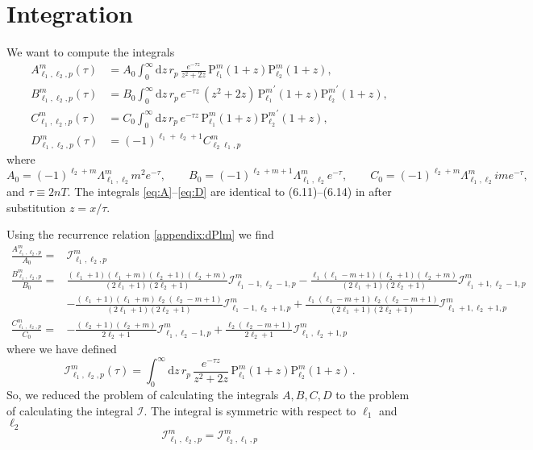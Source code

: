 \documentclass[10pt]{article}
\newcommand{\imag}{i} %
\newcommand{\e}{e}    %
\newcommand{\Plm}[2]{{\text{P}_{#1}^{#2}}}
\begin{document}
\section{Integration}

We want to compute the integrals
\begin{align}
\label{eq:A}
A_{\ell_1,\ell_2,p}^{m}(\tau) &= A_0 \int_0^\infty \mathrm{d}z \, r_p \, \frac{\e^{-\tau z}}{z^2+2z} \, \Plm{\ell_1}{m}(1+z) \Plm{\ell_2}{m}(1+z), \\
\label{eq:B}
B_{\ell_1,\ell_2,p}^{m}(\tau) &= B_0 \int_0^\infty \mathrm{d}z \, r_p \, \e^{-\tau z} \, (z^2+2z) \, \Plm{\ell_1}{m}^\prime(1+z) \Plm{\ell_2}{m}^\prime(1+z), \\
\label{eq:C}
C_{\ell_1,\ell_2,p}^{m}(\tau) &= C_0 \int_0^\infty \mathrm{d}z \, r_p \, \e^{-\tau z} \, \Plm{\ell_1}{m}(1+z) \Plm{\ell_2}{m}^\prime(1+z), \\
\label{eq:D}
D_{\ell_1,\ell_2,p}^{m}(\tau) &= (-1)^{\ell_1+\ell_2+1} C_{\ell_2\ell_1,p}^{m}
\end{align}
where
\begin{equation}
A_0 = (-1)^{\ell_2+m} \Lambda_{\ell_1,\ell_2}^m m^2 \e^{-\tau}, \qquad
B_0 = (-1)^{\ell_2+m+1} \Lambda_{\ell_1,\ell_2}^m \e^{-\tau}, \qquad
C_0 = (-1)^{\ell_2+m} \Lambda_{\ell_1,\ell_2}^m \imag m \e^{-\tau},
\end{equation}
and $\tau \equiv 2nT$.
The integrals \eqref{eq:A}--\eqref{eq:D} are identical to (6.11)--(6.14) in
\cite{hartmann} after substitution $z = x/\tau$.

Using the recurrence relation \eqref{appendix:dPlm} we find
\begin{align}
\frac{A_{\ell_1,\ell_2,p}^{m}}{A_0} =& \mathcal{I}_{\ell_1,\ell_2,p}^{m} \\
\nonumber
\frac{B_{\ell_1,\ell_2,p}^{m}}{B_0} =& \frac{(\ell_1+1)(\ell_1+m)(\ell_2+1)(\ell_2+m)}{(2\ell_1+1)(2\ell_2+1)} \mathcal{I}_{\ell_1-1,\ell_2-1,p}^{m} - \frac{\ell_1(\ell_1-m+1)(\ell_2+1)(\ell_2+m)}{(2\ell_1+1)(2\ell_2+1)} \mathcal{I}_{\ell_1+1,\ell_2-1,p}^{m} \\
& - \frac{(\ell_1+1)(\ell_1+m)\ell_2(\ell_2-m+1)}{(2\ell_1+1)(2\ell_2+1)} \mathcal{I}_{\ell_1-1,\ell_2+1,p}^{m} + \frac{\ell_1(\ell_1-m+1)\ell_2(\ell_2-m+1)}{(2\ell_1+1)(2\ell_2+1)} \mathcal{I}_{\ell_1+1,\ell_2+1,p}^{m} \\
\frac{C_{\ell_1,\ell_2,p}^{m}}{C_0} =& -\frac{(\ell_2+1)(\ell_2+m)}{2\ell_2+1} \mathcal{I}_{\ell_1,\ell_2-1,p}^{m} + \frac{\ell_2 (\ell_2-m+1)}{2\ell_2+1} \mathcal{I}_{\ell_1,\ell_2+1,p}^{m}
\end{align}
where we have defined
\begin{equation}
\mathcal{I}_{\ell_1,\ell_2,p}^{m}(\tau) = \int_0^\infty \mathrm{d}z \, r_p \, \frac{\e^{-\tau z}}{z^2+2z} \, \Plm{\ell_1}{m}(1+z) \Plm{\ell_2}{m}(1+z) \,.
\end{equation}
So, we reduced the problem of calculating the integrals $A,B,C,D$ to the problem of calculating the integral $\mathcal{I}$.
The integral is symmetric with respect to $\ell_1$ and $\ell_2$
\begin{equation}
\mathcal{I}_{\ell_1,\ell_2,p}^{m} = \mathcal{I}_{\ell_2,\ell_1,p}^{m}
\end{equation}
\end{document}
